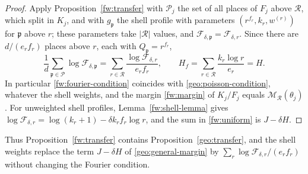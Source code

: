\begin{proof}
Apply Proposition~\ref{fw:transfer} with $\mathcal P_j$ the set of all
places of $F_j$ above $\mathcal R$, which split in $K_j$, and with
$g_{\mathfrak p}$ the shell profile with parameters
$(r^{f_r},k_r,w^{(r)})$ for $\mathfrak p$ above $r$; these parameters
take $|\mathcal R|$ values, and $\mathcal F_{\delta,\mathfrak
p}=\mathcal F_{\delta,r}$. Since there are $d/(e_rf_r)$ places above
$r$, each with $Q_{\mathfrak p}=r^{f_r}$,
\begin{equation}\label{fw:uniform}
 \frac1d\sum_{\mathfrak p\in\mathcal P}\log\mathcal F_{\delta,\mathfrak p}
 =\sum_{r\in\mathcal R}\frac{\log\mathcal F_{\delta,r}}{e_rf_r},
 \qquad
 H_f=\sum_{r\in\mathcal R}\frac{k_r\log r}{e_r}=H .
\end{equation}
In particular \eqref{fw:fourier-condition} coincides with
\eqref{geo:poisson-condition}, whatever the shell weights, and the
margin \eqref{fw:margin} of $K_j/F_j$ equals $\mathcal M_{\mathcal
R}(\theta_j)$. For unweighted shell profiles, Lemma~\ref{fw:shell-lemma}
gives $\log\mathcal F_{\delta,r}=\log(k_r+1)-\delta k_rf_r\log r$, and the
sum in \eqref{fw:uniform} is $J-\delta H$.
\end{proof}

Thus Proposition~\ref{fw:transfer} contains
Proposition~\ref{geo:transfer}, and the shell weights replace the term
$J-\delta H$ of \eqref{geo:general-margin} by
$\sum_r\log\mathcal F_{\delta,r}/(e_rf_r)$ without changing the Fourier
condition.
